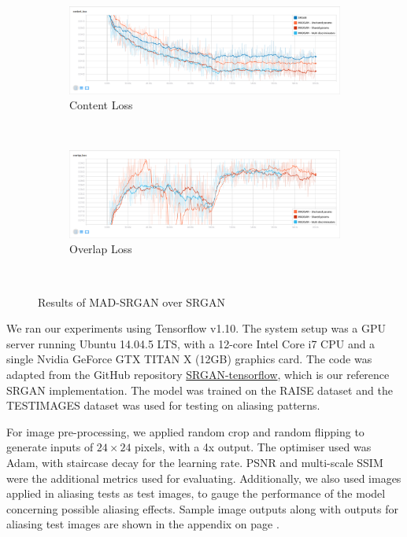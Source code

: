 \documentclass[12pt,a4paper]{article}
\begin{document}
\begin{multicols}{2}
\begin{figure}
\begin{subfigure}{0.48\textwidth}
                    \includegraphics[width=\textwidth]{images/cont-loss.png}
                    \caption{Content Loss}
                \end{subfigure}\\[5mm]
                \begin{subfigure}{0.48\textwidth}
                    \includegraphics[width=\textwidth]{images/ovrl-loss.png}
                    \caption{Overlap Loss}
                \end{subfigure}\\[2mm]
                \caption{Results of MAD-SRGAN over SRGAN}
                \label{fig:results}
            \end{figure}

            We ran our experiments using Tensorflow \cite{tensorflow} v1.10.
            The system setup was a GPU server running Ubuntu 14.04.5 LTS, with a 12-core Intel Core i7 CPU and a single Nvidia GeForce GTX TITAN X (12GB) graphics card.
            The code was adapted from the GitHub repository \href{https://github.com/brade31919/SRGAN-tensorflow}{SRGAN-tensorflow}, which is our reference SRGAN implementation.
            The model was trained on the RAISE dataset \cite{raise} and the TESTIMAGES dataset \cite{testimages-1,testimages-2} was used for testing on aliasing patterns.

            For image pre-processing, we applied random crop and random flipping to generate inputs of $24 \times 24$ pixels, with a 4x output.
            The optimiser used was Adam, with staircase decay for the learning rate.
            PSNR and multi-scale SSIM \cite{msssim} were the additional metrics used for evaluating.
            Additionally, we also used images applied in aliasing tests as test images, to gauge the performance of the model concerning possible aliasing effects.
            Sample image outputs along with outputs for aliasing test images are shown in the appendix on page \pageref{samples}.


\end{multicols}
\end{document}
